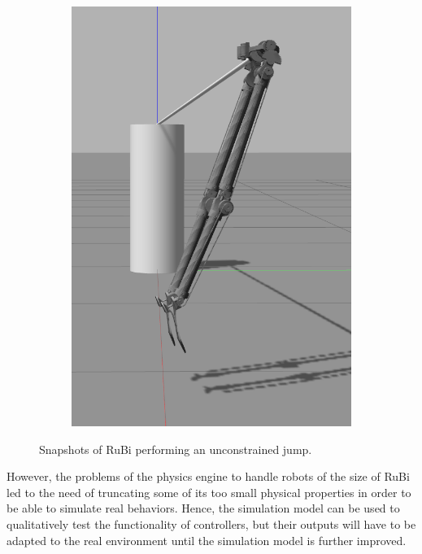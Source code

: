 \begin{figure}[ht!]
\begin{subfigure}[b]{0.16\textwidth}
        \includegraphics[width=\textwidth]{figures/gazebo_jumping_7}
    \end{subfigure}
    \caption{Snapshots of RuBi performing an unconstrained jump.}
    \label{fig:RuBi_jump_sequence}
\end{figure}      

However, the problems of the physics engine to handle robots of the size of RuBi led to the need of truncating some of its too small physical properties in order to be able to simulate real behaviors.
Hence, the simulation model can be used to qualitatively test the functionality of controllers, but their outputs will have to be adapted to the real environment until the simulation model is further improved.

